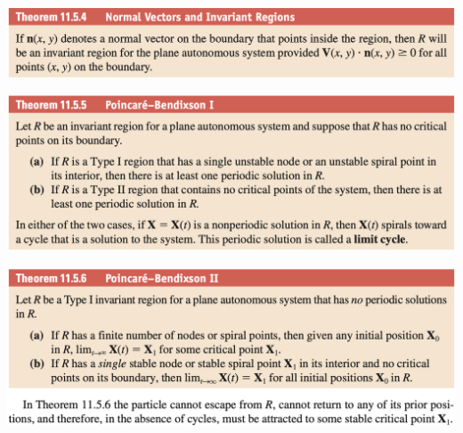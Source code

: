 \documentclass{article}
\begin{document}
\noindent
\includegraphics[scale=0.47]{normal-vectors-and-invariant-regions}

\noindent
\includegraphics[scale=0.47]{poincare-bendixson-i}

\noindent
\includegraphics[scale=0.47]{poincare-bendixson-ii}
\end{document}
